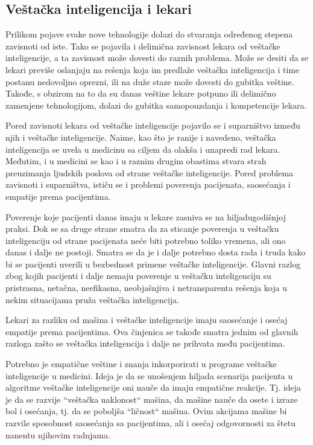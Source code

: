 \documentclass[a4paper]{article}
\begin{document}
\subsection{Veštačka inteligencija i lekari}
\label{subsec:veštačka_inteligencija_i_lekari}

Prilikom pojave svake nove tehnologije dolazi do stvaranja određenog stepena zavisnoti od iste. Tako se pojavila i delimična zavisnost lekara od veštačke inteligencije, a ta zavisnost može dovesti do raznih problema. Može se desiti da se lekari previše oslanjaju na rešenja koja im predlaže veštačka inteligencija i time postanu nedovoljno oprezni, ili na duže staze može dovesti do gubitka veštine. Takođe, s obzirom na to da su danas veštine lekare potpuno ili delimično zamenjene tehnologijom, dolazi do gubitka samopouzdanja i kompetencije lekara.

Pored zavisnoti lekara od veštačke inteligencije pojavilo se i suparništvo između njih i veštačke inteligencije. Naime, kao što je ranije i navedeno, veštačka inteligencija se uvela u medicinu sa ciljem da olakša i unapredi rad lekara. Međutim, i u medicini se kao i u raznim drugim obastima stvara strah preuzimanja ljudskih poslova od strane veštačke inteligencije. Pored problema zavisnoti i suparništva, ističu se i problemi poverenja pacijenata, saosećanja i empatije prema pacijentima.

Poverenje koje pacijenti danas imaju u lekare zasniva se na hiljadugodišnjoj praksi. Dok se sa druge strane smatra da za sticanje poverenja u veštačku inteligenciju od strane pacijenata neće biti potrebno toliko vremena, ali ono danas i dalje ne postoji. Smatra se da je i dalje potrebno dosta rada i truda kako bi se pacijenti uverili u bezbednost primene veštačke inteligencije. Glavni razlog zbog kojih pacijenti i dalje nemaju poverenje u veštačku inteligenciju su pristrasna, netačna, neefikasna, neobjašnjiva i netransparenta rešenja koja u nekim situacijama pruža veštačka inteligencija.

Lekari za razliku od mašina i veštačke inteligencije imaju saosećanje i osećaj empatije prema pacijentima. Ova činjenica se takođe smatra jednim od glavnih razloga zašto se veštačka inteligencija i dalje ne prihvata među pacijentima.

Potrebno je empatične veštine i znanja inkorporirati u programe veštačke inteligencije u medicini. Ideja je da se unošenjem hiljada scenarija pacijenta u algoritme veštačke inteligencije oni nauče da imaju empatične reakcije. Tj. ideja je da se razvije “veštačka naklonost“ mašina, da mašine nauče da osete i izraze bol i osećanja, tj. da se poboljša “ličnost“ mašina. Ovim akcijama mašine bi razvile sposobnost saosećanja sa pacijentima, ali i osećaj odgovornosti za štetu nanentu njihovim radnjama.
\end{document}
